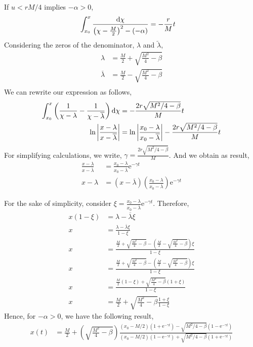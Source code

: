 If $u<rM/4$ implies $-\alpha>0$,
\begin{align*}
	\int_{x_0}^{x}\frac{\mathrm{d} \chi}{\left(\chi-\frac{M}{2}\right)^2-(-\alpha)} &=-\frac{r}{M}t
\end{align*}
Considering the zeros of the denominator, $\lambda$ and $\overleftarrow{\lambda}$, 
\begin{equation}
	\begin{array}{cc}
	\lambda&=\frac{M}{2}+\sqrt{\frac{M^2}{4}-\beta} \\
	\overline{\lambda}&=\frac{M}{2}-\sqrt{\frac{M^2}{4}-\beta} \\
	\end{array}
\end{equation}
We can rewrite our expression as follows, 
\begin{align*}
\int_{x_0}^{x} \left(\frac{1}{\chi - \lambda}-\frac{1}{\chi - \overline{\lambda}}\right)\mathrm{d} \chi &=-\frac{2r\sqrt{M^2/4-\beta}}{M}t \\
	\ln\left|\frac{x - \lambda}{x - \overline{\lambda}}\right|&=\ln\left|\frac{x_0- \lambda}{x_0 - \overline{\lambda}}\right|-\frac{2r\sqrt{M^2/4-\beta}}{M}t
\end{align*}
For simplifying calculations, we write, $\gamma=\frac{2r\sqrt{M^2/4-\beta}}{M}$. And we obtain as result,
\begin{align}
\frac{x - \lambda}{x - \overline{\lambda}} &=\frac{x_0- \lambda}{x_0- \overline{\lambda}}\mathrm e^{-\gamma t} \\
x-\lambda &=\left(x-\overline{\lambda}\right)\left(\frac{x_0- \lambda}{x_0- \overline{\lambda}}\right)\mathrm e^{-\gamma t}
\end{align}

For the sake of simplicity, consider $\xi=\frac{x_0-\lambda}{x_0-\overline{\lambda}}\mathrm{e}^{-\gamma t}$. Therefore,
\begin{align*}
	x\left(1-\xi\right)&=\lambda-\overline{\lambda}\xi\\
	x&=\frac{\lambda-\overline{\lambda}\xi}{1-\xi} \\	
	x&=\frac{\frac{M}{2}+\sqrt{\frac{M^2}{4}-\beta}-\left(\frac{M}{2}-\sqrt{\frac{M^2}{4}-\beta}\right)\xi}{1-\xi}\\
	x&=\frac{\frac{M}{2}+\sqrt{\frac{M^2}{4}-\beta}-\left(\frac{M}{2}-\sqrt{\frac{M^2}{4}-\beta}\right)\xi}{1-\xi}\\
	x&=\frac{\frac{M}{2}\left(1-\xi\right)+\sqrt{\frac{M^2}{4}-\beta}\left(1+\xi\right)}{1-\xi}\\
	x&=\frac{M}{2}+\sqrt{\frac{M^2}{4}-\beta}\frac{1+\xi}{1-\xi}
\end{align*}
Hence, for $-\alpha>0$, we have the following result,
\begin{align}
	x(t)&=\frac{M}{2}+\left(\sqrt{\frac{M^2}{4}-\beta}\right)\frac{\left(x_0-M/2\right)\left(1+\mathrm e^{-\gamma t}\right)-\sqrt{M^2/4-\beta}\left(1-\mathrm{e}^{-\gamma t}\right)}{\left(x_0-M/2\right)\left(1-\mathrm e^{-\gamma t}\right)+\sqrt{M^2/4-\beta}\left(1+\mathrm{e}^{-\gamma t}\right)} \label{eq: Time Expression for Harvest}
\end{align}

